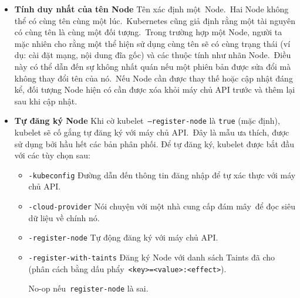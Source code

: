 \documentclass[12pt,a4paper]{report}
\begin{document}
	\begin{itemize}
		\item \textbf{Tính duy nhất của tên Node}
		\smallskip
		\subitem Tên xác định một Node. Hai Node không thể có cùng tên cùng một lúc. Kubernetes cũng giả định rằng một tài nguyên có cùng tên là cùng một đối tượng. Trong trường hợp một Node, người ta mặc nhiên cho rằng một thể hiện sử dụng cùng tên sẽ có cùng trạng thái (ví dụ: cài đặt mạng, nội dung đĩa gốc) và các thuộc tính như nhãn Node. Điều này có thể dẫn đến sự không nhất quán nếu một phiên bản được sửa đổi mà không thay đổi tên của nó. Nếu Node cần được thay thế hoặc cập nhật đáng kể, đối tượng Node hiện có cần được xóa khỏi máy chủ API trước và thêm lại sau khi cập nhật.
		\smallskip
		\item \textbf{Tự đăng ký Node}
		\smallskip
		\subitem Khi cờ kubelet \texttt{--register-node} là \texttt{true} (mặc định), kubelet sẽ cố gắng tự đăng ký với máy chủ API. Đây là mẫu ưa thích, được sử dụng bởi hầu hết các bản phân phối.
		\smallskip
		\subitem Để tự đăng ký, kubelet được bắt đầu với các tùy chọn sau:
		
		\begin{itemize}
			\item \texttt{-kubeconfig} Đường dẫn đến thông tin đăng nhập để tự xác thực với máy chủ API.
			\item \texttt{-cloud-provider} Nói chuyện với một nhà cung cấp đám mây để đọc siêu dữ liệu về chính nó.
			\item \texttt{-register-node} Tự động đăng ký với máy chủ API.
			\item \texttt{-register-with-taints} Đăng ký Node với danh sách Taints đã cho (phân cách bằng dấu phẩy \texttt{<key>=<value>:<effect>}).
			
			No-op nếu \texttt{register-node} là sai.
			

\end{itemize}
\end{itemize}
\end{document}
